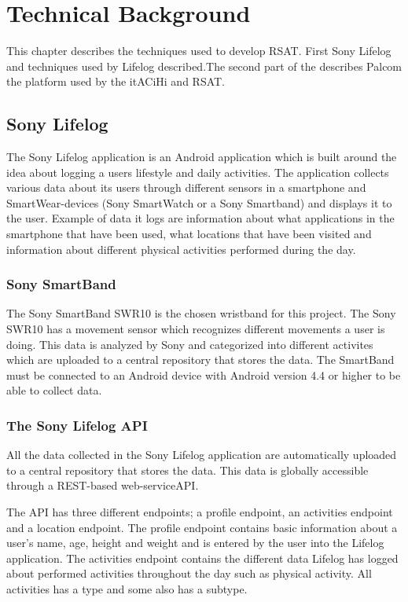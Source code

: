 \documentclass{cslthse-msc}
\begin{document}
\chapter[Technical Background]{Technical Background}

This chapter describes the techniques used to develop RSAT. First Sony Lifelog and techniques used by Lifelog described.The second part of the describes Palcom the platform used by the itACiHi and RSAT. 

\section{Sony Lifelog}

The Sony Lifelog application is an Android application which is built around the idea about logging a users lifestyle and daily activities\cite{LifeLogDescr}. The application collects various data about its users through different sensors in a smartphone and SmartWear-devices (Sony SmartWatch or a Sony Smartband) and displays it to the user. Example of data it logs are information about what applications in the smartphone that have been used, what locations that have been visited and information about different physical activities performed during the day.  

\subsection{Sony SmartBand}

The Sony SmartBand SWR10 is the chosen wristband for this project. The Sony SWR10 has a movement sensor which recognizes different movements a user is doing\cite{SWR10}. This data is analyzed by Sony and categorized into different activites which are uploaded to a central repository that stores the data. The SmartBand must be connected to an Android device with Android version 4.4 or higher to be able to collect data. 

\subsection{The Sony Lifelog API} 
All the data collected in the Sony Lifelog application are automatically uploaded to a central repository that stores the data. This data is globally accessible through a REST-based web-serviceAPI\cite{LifeLogDescr}. 

The API has three different endpoints; a profile endpoint, an activities endpoint and a location endpoint. The profile endpoint contains basic information about a user's name, age, height and weight and is entered by the user into the Lifelog application. The activities endpoint contains the different data Lifelog has logged about performed activities throughout the day such as physical activity. All activities has a type and some also has a subtype. 
\end{document}
